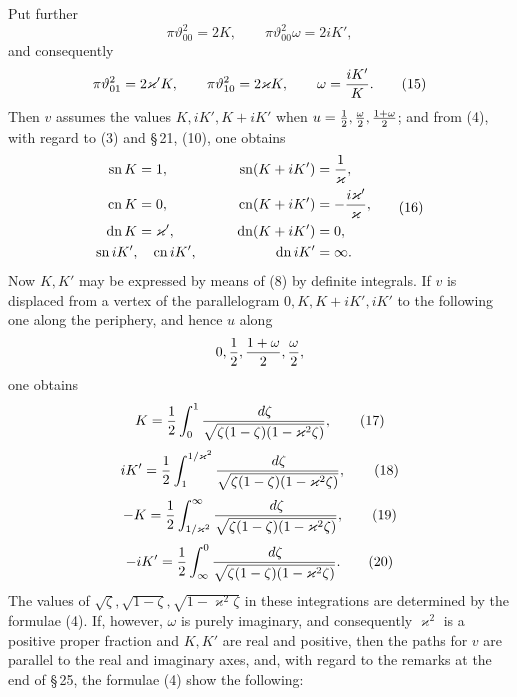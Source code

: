 \documentclass[11pt]{article}
\providecommand{\dd}{\,d}
\providecommand{\tht}{\vartheta}
\providecommand{\sn}{\operatorname{sn}}
\providecommand{\cn}{\operatorname{cn}}
\providecommand{\dn}{\operatorname{dn}}
\begin{document}
Put further
\begin{equation}
\pi\tht_{00}^{2}=2K,
\qquad
\pi\tht_{00}^{2}\omega=2iK',
\tag{14}
\end{equation}
and consequently
\begin{equation}
\pi\tht_{01}^{2}=2\varkappa'K,
\qquad
\pi\tht_{10}^{2}=2\varkappa K,
\qquad
\omega={iK'\over K}.
\tag{15}
\end{equation}
Then $v$ assumes the values $K,iK',K+iK'$ when $u={1\over2},{\omega\over2},{1+\omega\over2}$; and from (4), with regard to (3) and \S\,21, (10), one obtains
\begin{equation}
\begin{aligned}
\sn K&=1,&\qquad \sn(K+iK')&={1\over\varkappa},\\
\cn K&=0,&\qquad \cn(K+iK')&=-{i\varkappa'\over\varkappa},\\
\dn K&=\varkappa',&\qquad \dn(K+iK')&=0,\\
\sn iK',&\quad \cn iK',&\quad \dn iK'&=\infty.
\end{aligned}
\tag{16}
\end{equation}
Now $K,K'$ may be expressed by means of (8) by definite integrals. If $v$ is displaced from a vertex of the parallelogram $0,K,K+iK',iK'$ to the following one along the periphery, and hence $u$ along
\[
0,{1\over2},{1+\omega\over2},{\omega\over2},
\]
one obtains
\begin{equation}
K={1\over2}\int_0^1 {\dd\zeta\over\sqrt{\zeta(1-\zeta)(1-\varkappa^2\zeta)}},
\tag{17}
\end{equation}
\begin{equation}
iK'={1\over2}\int_1^{1/\varkappa^2}{\dd\zeta\over\sqrt{\zeta(1-\zeta)(1-\varkappa^2\zeta)}},
\tag{18}
\end{equation}
\begin{equation}
-K={1\over2}\int_{1/\varkappa^2}^{\infty}{\dd\zeta\over\sqrt{\zeta(1-\zeta)(1-\varkappa^2\zeta)}},
\tag{19}
\end{equation}
\begin{equation}
-iK'={1\over2}\int_\infty^0 {\dd\zeta\over\sqrt{\zeta(1-\zeta)(1-\varkappa^2\zeta)}}.
\tag{20}
\end{equation}
The values of $\sqrt\zeta,\sqrt{1-\zeta},\sqrt{1-\varkappa^2\zeta}$ in these integrations are determined by the formulae (4). If, however, $\omega$ is purely imaginary, and consequently $\varkappa^2$ is a positive proper fraction and $K,K'$ are real and positive, then the paths for $v$ are parallel to the real and imaginary axes, and, with regard to the remarks at the end of \S\,25, the formulae (4) show the following:
\end{document}
